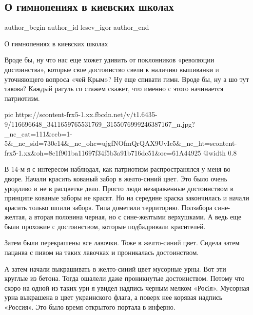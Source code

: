  
 
 
 
 
 
\subsection{О гимнопениях в киевских школах}
\label{sec:31_07_2020.fb.lesev_igor.1.kiev_shkola_gimn}
 
\ifcmt
 author_begin
   author_id lesev_igor
 author_end
\fi

О гимнопениях в киевских школах

Вроде бы, ну что нас еще может удивить от поклонников «революции достоинства»,
которые свое достоинство свели к наличию вышиванки и уточняющего вопроса «чей
Крым»? Ну еще спивати гимн. Вроде бы, ну а шо тут такова? Каждый рагуль со
стажем скажет, что именно с этого начинается патриотизм.

\ifcmt
  pic https://scontent-frx5-1.xx.fbcdn.net/v/t1.6435-9/116696648_3411659765531769_3155076999246387167_n.jpg?_nc_cat=111&ccb=1-5&_nc_sid=730e14&_nc_ohc=ujgfNOfmQrQAX9UvIc5&_nc_ht=scontent-frx5-1.xx&oh=8e1f901ba11697f34f5b3a91b716dc51&oe=61A44925
  @width 0.8
\fi

В 14-м я с интересом наблюдал, как патриотизм распространялся у меня во дворе.
Начали красить кованый забор в желто-синий цвет. Это было очень уродливо и не в
расцветке дело. Просто люди незараженные достоинством в принципе кованые заборы
не красят. Но на середине краска закончилась и начали красить только шпили
забора. Типа дометили территорию. Ползабора сине-желтая, а вторая половина
черная, но с сине-желтыми верхушками. А ведь еще были прохожие с достоинством,
которые подбадривали красителей.

Затем были перекрашены все лавочки. Тоже в желто-синий цвет. Сидела затем
пацанва с пивом на таких лавочках и проникалась достоинством.

А затем начали выкрашивать в желто-синий цвет мусорные урны. Вот эти круглые из
бетона. Тогда ошалели даже проникнутые достоинством. Потому что скоро на одной
из таких урн я увидел надпись черным мелком «Росiя». Мусорная урна выкрашена в
цвет украинского флага, а поверх нее корявая надпись «Россия». Это было время
открытого портала в инферно.

